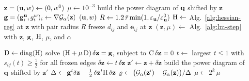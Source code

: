 \documentclass[main.tex]{subfiles}
\begin{document}
\begin{algorithm}[H]
  \caption{Newton solve of $\jointdual_\alpha$ or of $\jointdual$.}
  \label{alg:newton}
  \begin{algorithmic}[1]
    \Require {}
    \State $\mathbf{z} = (\mathbf{u}, w) \gets (0, w^0)$
    \State $\mu \gets 10^{-3}$
    \State build the power diagram of $\mathbf{q}$ shifted by $\mathbf{z}$ \Comment{\eqref{eq:shifted-site}}
      \State $\mathbf{g} = (\mathbf{g}^{\mathbf{u}}_i, g^w_i)_i \gets \nabla\mathcal{G}_\alpha(\mathbf{z})$ \Comment{\eqref{eq:joint-gradient}, \eqref{eq:regularized-gradient-shift}}
        \State \Return $(\mathbf{u}, w)$
      \EndIf
      \State $R \gets 1.2\,\bar{r}\min(1, \varepsilon_{\mathbf{u}} / \varepsilon^0_{\mathbf{u}})$
      \State $\mathrm{H} \gets$ Alg.~\ref{alg:hessian-reg} at $\mathbf{z}$ with pair radius $R$
      \State freeze $d_{ij}$ and $\mathbf{e}_{ij}$ at $\mathbf{z}$
      \State $(\mathbf{z}, \mu) \gets$ Alg.~\ref{alg:lm-step} with $\mathbf{z}$, $\mathbf{g}$, $\mathrm{H}$, $\mu$, and $\alpha$
    \EndFor
  \end{algorithmic}
\end{algorithm}

\begin{algorithm}[H]
  \caption{Levenberg--Marquardt step on $\jointdual_\alpha$ or on $\jointdual$.}
  \label{alg:lm-step}
  \begin{algorithmic}[1]
    \Require {}
    \State $\mathrm{D} \gets \mathrm{diag}(\mathrm{H})$
      \State solve $(\mathrm{H} + \mu\,\mathrm{D})\,\delta\mathbf{z} = \mathbf{g}$, subject to $\mathrm{C}\,\delta\mathbf{z} = 0$ \Comment{\S\ref{sec:implementation}, \eqref{eq:flow-constrained-elimination-update}}
      \State $t \gets$ largest $t \le 1$ with 
      \Statex \hspace{\algorithmicindent} $s_{ij}(t) \ge \tfrac{1}{2}$ for all frozen edges
      \State $\delta\mathbf{z} \gets t\,\delta\mathbf{z}$
      \State $\mathbf{z}' \gets \mathbf{z} + \delta\mathbf{z}$
      \State build the power diagram of $\mathbf{q}$ shifted by $\mathbf{z}'$ \Comment{\eqref{eq:shifted-site}}
      \State $\Delta \gets \mathbf{g}^{t}\delta\mathbf{z} - \tfrac{1}{2}\,\delta\mathbf{z}^{t}\mathrm{H}\,\delta\mathbf{z}$ 
      \State $\varrho \gets \bigl(\mathcal{G}_\alpha(\mathbf{z}') - \mathcal{G}_\alpha(\mathbf{z})\bigr) / \Delta$ 
        \State \Return {}
      \EndIf
      \State $\mu \gets 2^k\,\mu$ 
    \EndFor
  \end{algorithmic}
\end{algorithm}
\end{document}
